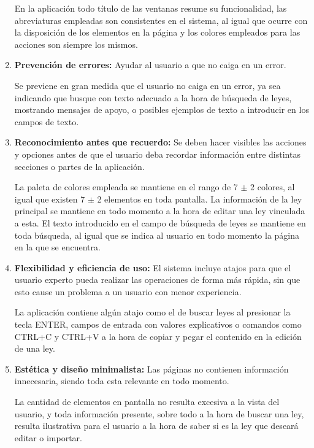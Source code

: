 \begin{enumerate}
    En la aplicación todo título de las ventanas resume su funcionalidad, las abreviaturas empleadas son consistentes en el sistema, al igual que ocurre con la disposición de los elementos en la página y los colores empleados para las acciones son siempre los mismos.
    
    
    \item {\bf Prevención de errores:} Ayudar al usuario a que no caiga en un error.
    
    Se previene en gran medida que el usuario no caiga en un error, ya sea indicando que busque con texto adecuado a la hora de búsqueda de leyes, mostrando mensajes de apoyo, o posibles ejemplos de texto a introducir en los campos de texto.
    
    \item {\bf Reconocimiento antes que recuerdo:} Se deben hacer visibles las acciones y opciones antes de que el usuario deba recordar información entre distintas secciones o partes de la aplicación.
    
    
    La paleta de colores empleada se mantiene en el rango de 7 $\pm$ 2 colores, al igual que existen 7 $\pm$ 2 elementos en toda pantalla. La información de la ley principal se mantiene en todo momento a la hora de editar una ley vinculada a esta. El texto introducido en el campo de búsqueda de leyes se mantiene en toda búsqueda, al igual que se indica al usuario en todo momento la página en la que se encuentra.
    
    
    \item {\bf Flexibilidad y eficiencia de uso:} El sistema incluye atajos para que el usuario experto pueda realizar las operaciones de forma más rápida, sin que esto cause un problema a un usuario con menor experiencia.
    
    La aplicación contiene algún atajo como el de buscar leyes al presionar la tecla ENTER, campos de entrada con valores explicativos o comandos como CTRL+C y CTRL+V a la hora de copiar y pegar el contenido en la edición de una ley.
    
    
    \item {\bf Estética y diseño minimalista:} Las páginas no contienen información innecesaria, siendo toda esta relevante en todo momento.
    
    La cantidad de elementos en pantalla no resulta excesiva a la vista del usuario, y toda información presente, sobre todo a la hora de buscar una ley, resulta ilustrativa para el usuario a la hora de saber si es la ley que deseará editar o importar.
    

\end{enumerate}
